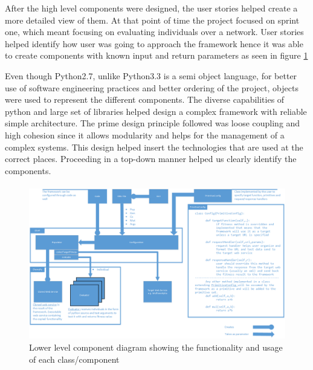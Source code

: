 After the high level components were designed, the user stories helped create a more detailed view of them. At that point of
time the project focused on sprint one, which meant focusing on evaluating individuals over a network.
User stories helped identify how user was going to approach the framework hence it was able to create components with known
input and return parameters as seen in figure \ref{fig:classd}

Even though Python2.7, unlike Python3.3 is a semi object language, for better use of software engineering practices and better ordering of the project,
objects were used to represent the different components. The diverse capabilities of python and large set of libraries helped design a complex framework with reliable simple architecture. The prime design principle followed
was loose coupling and high cohesion since it allows modularity and helps for the management of a complex systems. This design helped insert the technologies that are used at the correct
places. Proceeding in a top-down manner helped us clearly identify the components.
\paragraph{}
\begin{landscape}
\begin{figure}[htp]
\centering
\includegraphics[scale=0.7]{Figures/Class.png}
\caption{Lower level component diagram showing the functionality and usage of each class/component}
\label{fig:classd}
\end{figure}
\end{landscape}